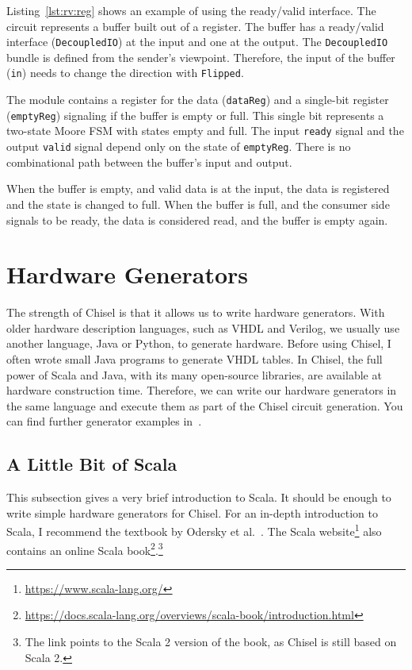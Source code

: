 \documentclass[%
    10pt,
    headinclude, footexclude,
    openright, %
    notitlepage,
    cleardoubleempty,
    headsepline,
    pointlessnumbers,
    bibtotoc, idxtotoc,
    ]{scrbook}
\newcommand{\code}[1]{{\lstinline[basicstyle=\small\ttfamily]{#1}}}
\newcommand{\myref}[2]{\href{#1}{#2}}
\renewcommand{\myref}[2]{{#2}{\footnote{\url{#1}}}}
\begin{document}
Listing~\ref{lst:rv:reg} shows an example of using the ready/valid interface.
The circuit represents a buffer built out of a register.
The buffer has a ready/valid interface (\code{DecoupledIO}) at the input and one at the output.
The \code{DecoupledIO} bundle is defined from the sender's viewpoint. Therefore,
the input of the buffer (\code{in}) needs to change the direction with \code{Flipped}.

The module contains a register for the data (\code{dataReg}) and a single-bit
register (\code{emptyReg}) signaling if the buffer is empty or full.
This single bit represents a two-state Moore FSM with states empty and full.
The input \code{ready} signal and the output \code{valid} signal depend only
on the state of \code{emptyReg}. There is no combinational path between the
buffer's input and output.

When the buffer is empty, and valid data is at the input, the data is registered
and the state is changed to full. When the buffer is full, and the consumer side signals
to be ready, the data is considered read, and the buffer is empty again.


\chapter{Hardware Generators}
\label{ch:gen}

The strength of Chisel is that it allows us to write hardware generators.
With older hardware description languages, such as VHDL and Verilog,
we usually use another language, Java or Python, to generate hardware.
Before using Chisel, I often wrote small Java programs to generate VHDL tables.
In Chisel, the full power of Scala and Java, with its many open-source libraries,
are available at hardware construction time. Therefore, we can write our hardware
generators in the same language and execute them as part of the Chisel circuit generation.
You can find further generator examples in~\cite{hwgen:chisel:2024}.

\section{A Little Bit of Scala}

This subsection gives a very brief introduction to Scala. It should be enough
to write simple hardware generators for Chisel.
For an in-depth introduction to Scala, I recommend the textbook by Odersky et al.~\cite{Scala}.
The \myref{https://www.scala-lang.org/}{Scala website} also contains an
\myref{https://docs.scala-lang.org/overviews/scala-book/introduction.html}{online Scala book}.\footnote{The link
points to the Scala 2 version of the book, as Chisel is still based on Scala 2.}
\end{document}
